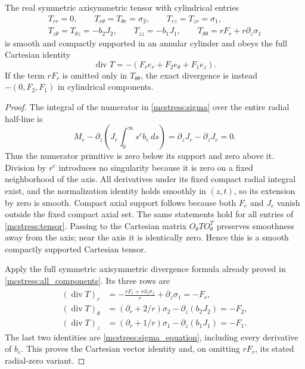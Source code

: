 \begin{theorem}\label{mcstress:completion}
The real symmetric axisymmetric tensor with cylindrical entries
\begin{equation}\label{mcstress:tensor}
\begin{gathered}
 T_{rr}=0,\qquad T_{r\theta}=T_{\theta r}=\sigma_2,\qquad
 T_{rz}=T_{zr}=\sigma_1,\\
 T_{z\theta}=T_{\theta z}=-b_2J_2,\qquad
 T_{zz}=-b_1J_1,\qquad
 T_{\theta\theta}=rF_r+r\partial_z\sigma_1
\end{gathered}
\end{equation}
is smooth and compactly supported in an annular cylinder and obeys
the full Cartesian identity
\begin{equation}\label{mcstress:divergence}
 \operatorname{div}T=-(F_r e_r+F_2e_\theta+F_1e_z).
\end{equation}
If the term $rF_r$ is omitted only in $T_{\theta\theta}$, the exact
divergence is instead $-(0,F_2,F_1)$ in cylindrical components.
\end{theorem}
\begin{proof}
The integral of the numerator in \eqref{mcstress:sigma} over the
entire radial half-line is
\[
 M_e-\partial_z\left(J_e\int_0^\infty s^eb_e\,ds\right)
  =\partial_zJ_e-\partial_zJ_e=0.
\]
Thus the numerator primitive is zero below its support and zero above
it. Division by $r^e$ introduces no singularity because it is zero on
a fixed neighborhood of the axis. All derivatives under its fixed
compact radial integral exist, and the normalization identity holds
smoothly in $(z,t)$, so its extension by zero is smooth. Compact axial
support follows because both $F_e$ and $J_e$ vanish outside the fixed
compact axial set. The same statements hold for all entries of
\eqref{mcstress:tensor}. Passing to the Cartesian matrix
$O_\theta T O_\theta^T$ preserves smoothness away from the axis; near
the axis it is identically zero. Hence this is a smooth compactly
supported Cartesian tensor.

Apply the full symmetric axisymmetric divergence formula already
proved in \eqref{mcstress:all_components}. Its three rows are
\[
 \begin{aligned}
 (\operatorname{div}T)_r
   &=-\frac{rF_r+r\partial_z\sigma_1}{r}
                                     +\partial_z\sigma_1=-F_r,\\
 (\operatorname{div}T)_\theta
   &=(\partial_r+2/r)\sigma_2-\partial_z(b_2J_2)=-F_2,\\
 (\operatorname{div}T)_z
   &=(\partial_r+1/r)\sigma_1-\partial_z(b_1J_1)=-F_1.
 \end{aligned}
\]
The last two identities are \eqref{mcstress:sigma_equation}, including
every derivative of $b_e$. This proves the Cartesian vector identity
and, on omitting $rF_r$, its stated radial-zero variant.
\end{proof}

